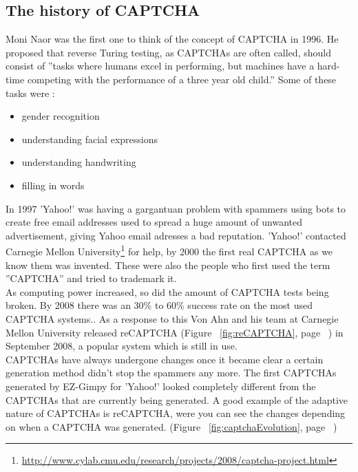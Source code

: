\documentclass[pdftex,a4paper,12pt,twoside]{report}
\theoremstyle{plain} \newtheorem{theorem}{Theorem} \newtheorem{proposition}{Proposition} \newtheorem{lemma}{Lemma} \newtheorem*{corollary}{Corollary}
\theoremstyle{definition} \newtheorem{definition}{Definition} \newtheorem{conjecture}{Conjecture} \newtheorem*{example}{Example} \newtheorem{algorithm}{Algorithm}
\theoremstyle{remark} \newtheorem*{remark}{Remark} \newtheorem*{note}{Note} \newtheorem{case}{Case}
\begin{document}
\subsection{The history of CAPTCHA}
Moni Naor was the first one to think of the concept of CAPTCHA in 1996. He proposed that reverse Turing testing, as CAPTCHAs are often called, should consist of ''tasks where humans excel in performing, but machines have a hard-time competing with the performance of a three year old child.'' Some of these tasks were \citep{Naor1996}:
\begin{itemize}
\item gender recognition
\item understanding facial expressions
\item understanding handwriting
\item filling in words
\end{itemize}
In 1997 'Yahoo!' was having a gargantuan problem with spammers using bots to create free email addresses used to spread a huge amount of unwanted advertisement, giving Yahoo email adresses a bad reputation. 'Yahoo!' contacted Carnegie Mellon University\footnote{\url{http://www.cylab.cmu.edu/research/projects/2008/captcha-project.html}} for help, by 2000 the first real CAPTCHA as we know them was invented\citep{Egen2009}. These were also the people who first used the term ''CAPTCHA'' and tried to trademark it.\\As computing power increased, so did the amount of CAPTCHA tests being broken. By 2008 there was an 30\% to 60\% success rate on the most used CAPTCHA systems.\citep{Yan2008}. As a  response to this Von Ahn and his team at Carnegie Mellon University released reCAPTCHA (Figure ~\ref{fig:reCAPTCHA}, page ~\pageref{fig:reCAPTCHA}) in September 2008, a popular system which is still in use.\\CAPTCHAs have always undergone changes once it became clear a certain generation method didn't stop the spammers any more. The first CAPTCHAs generated by EZ-Gimpy for 'Yahoo!' looked completely different from the CAPTCHAs that are currently being generated. A good example of the adaptive nature of CAPTCHAs is reCAPTCHA, were you can see the changes depending on when a CAPTCHA was generated. (Figure ~\ref{fig:captchaEvolution}, page ~\pageref{fig:captchaEvolution})
\end{document}
